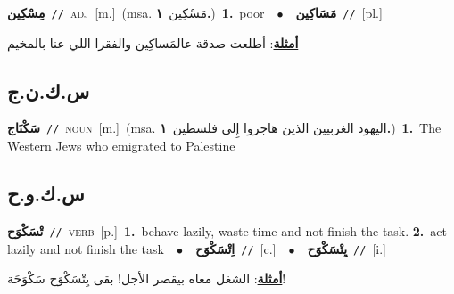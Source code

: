 \documentclass[10pt,a4paper,twoside]{article} %
\begin{document}
\begin{multicols}{2}
{\setlength\topsep{0pt}\textbf{\foreignlanguage{arabic}{مِسْكِين}}\ {\color{gray}\texttt{//}\color{black}}\ \textsc{adj}\ [m.]\ \color{gray}(msa. \foreignlanguage{arabic}{مَسْكِين}~\foreignlanguage{arabic}{\textbf{١.}})\color{black}\ \textbf{1.}~poor\ \ $\bullet$\ \ \setlength\topsep{0pt}\textbf{\foreignlanguage{arabic}{مَسَاكِين}}\ {\color{gray}\texttt{//}\color{black}}\ [pl.]\  \begin{flushright}\color{gray}\foreignlanguage{arabic}{\textbf{\underline{\foreignlanguage{arabic}{أمثلة}}}: أطلعت صدقة عالمَساكِين والفقرا اللي عنا بالمخيم}\end{flushright}\color{black}} \vspace{2mm}

\vspace{-3mm}
\subsection*{\color{blue}\foreignlanguage{arabic}{س.ك.ن.ج}\color{blue}{ (ntws)}} 

{\setlength\topsep{0pt}\textbf{\foreignlanguage{arabic}{سَكْنَاج}}\ {\color{gray}\texttt{//}\color{black}}\ \textsc{noun}\ [m.]\ \color{gray}(msa. \foreignlanguage{arabic}{اليهود الغربيين الذين هاجروا إِلى فلسطين}~\foreignlanguage{arabic}{\textbf{١.}})\color{black}\ \textbf{1.}~The Western Jews who emigrated to Palestine\ } \vspace{2mm}

\vspace{-3mm}
\subsection*{\color{blue}\foreignlanguage{arabic}{س.ك.و.ح}\color{blue}{}} 

{\setlength\topsep{0pt}\textbf{\foreignlanguage{arabic}{تْسَكْوَح}}\ {\color{gray}\texttt{//}\color{black}}\ \textsc{verb}\ [p.]\ \textbf{1.}~behave lazily, waste time and not finish the task.  \textbf{2.}~act lazily and not finish the task\ \ $\bullet$\ \ \setlength\topsep{0pt}\textbf{\foreignlanguage{arabic}{اِتْسَكْوَح}}\ {\color{gray}\texttt{//}\color{black}}\ [c.]\ \ $\bullet$\ \ \setlength\topsep{0pt}\textbf{\foreignlanguage{arabic}{يِتْسَكْوَح}}\ {\color{gray}\texttt{//}\color{black}}\ [i.]\  \begin{flushright}\color{gray}\foreignlanguage{arabic}{\textbf{\underline{\foreignlanguage{arabic}{أمثلة}}}: الشغل معاه بيقصر الأجل! بقى يِتْسَكْوَح سَكْوَحَة!}\end{flushright}\color{black}} \vspace{2mm}


\end{multicols}
\end{document}

